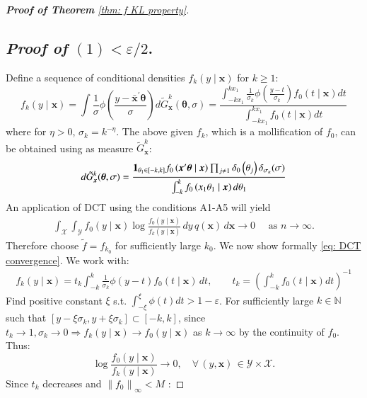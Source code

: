 \begin{proof}[\hypertarget{proof of thm KL property}{\textbf{Proof of Theorem}} \ref{thm: f KL property}]
\subsection*{\textit{Proof of} $(1) < \varepsilon/2$.}
Define a sequence of conditional densities $f_k(y \mid \boldsymbol{x})$ for $k \geq 1$: 
$$
f_k(y \mid \boldsymbol{x})= \int \frac{1}{\sigma} \phi\left(\frac{y-\bar{\boldsymbol{x}}^{\prime} \boldsymbol{\theta}}{\sigma}\right) d \tilde{G}^k_{\boldsymbol{x}}(\boldsymbol{\theta}, \sigma) =\frac{\int_{-k x_1}^{k x_1} \frac{1}{\sigma_k} \phi\left(\frac{y-t}{\sigma_k}\right) f_0(t \mid \boldsymbol{x}) d t}{\int_{-k x_1}^{k x_1} f_0(t \mid \boldsymbol{x}) d t}
$$
where for $\eta >0$, $\sigma_k=k^{-\eta}$. The above given $f_k$, which is a mollification of $f_0$, can be obtained using as measure $\tilde{G}^k_{\boldsymbol{x}}$:
$$
d \tilde{G}^k_{ \boldsymbol{x}}(\boldsymbol{\theta}, \sigma)=\frac{\mathbf{1}_{\theta_1 \in[-k, k]} f_0\left(\boldsymbol{x}^{\prime} \boldsymbol{\theta} \mid \boldsymbol{x}\right) \prod_{j\neq 1} \delta_0\left(\theta_j\right) \delta_{\sigma_n}(\sigma)}{\int_{-k}^k f_0\left(x_1 \theta_1 \mid \boldsymbol{x}\right) d \theta_1}
$$
An application of DCT using the conditions A1-A5 will yield
\begin{align}\label{eq: DCT convergence}
\int_{\mathcal{X}} \int_{\mathcal{Y}} f_0(y \mid \boldsymbol{x}) \log \frac{f_0(y \mid \boldsymbol{x})}{f_k(y \mid \boldsymbol{x})} \, d y \, q(\boldsymbol{x}) \, d \boldsymbol{x} \rightarrow 0 \quad \text { as } n \rightarrow \infty.
\end{align}
Therefore choose $\tilde{f}=f_{k_0}$ for sufficiently large $k_0 $. We now show formally \eqref{eq: DCT convergence}. We work with:
\begin{align}
f_k(y \mid \boldsymbol{x})  =t_k \int_{-k}^k \frac{1}{\sigma_k} \phi(y-t) f_0(t \mid \boldsymbol{x}) \, d t, \quad \quad t_k =\left(\int_{-k}^k f_0(t \mid \boldsymbol{x}) d t\right)^{-1}
\end{align}
Find positive constant $\xi$ s.t. $\int_{-\xi}^{\xi} \phi(t) d t>1-\varepsilon$.
For sufficiently large $k \in \mathbb{N}$ such that $\left[y-\xi \sigma_k, y+\xi \sigma_k\right] \subset[-k, k]$,
since $ t_k \rightarrow 1, \sigma_k \rightarrow 0 \Rightarrow f_k(y \mid \boldsymbol{x}) \rightarrow f_0(y \mid \boldsymbol{x})$ as $k \rightarrow \infty$ by the continuity of $f_0$. Thus:
$$
\log \frac{f_0(y \mid \boldsymbol{x})}{f_k(y \mid \boldsymbol{x})} \rightarrow 0, \quad \forall \, (y, \boldsymbol{x}) \, \in \mathcal{Y} \times \mathcal{X}.
$$
Since $t_k$ decreases and $\left\|f_0\right\|_{\infty}<M$ :

\end{proof}
